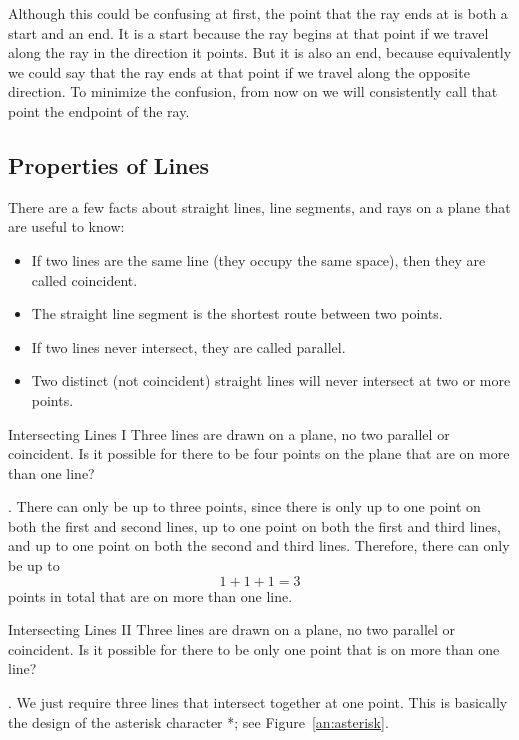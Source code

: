 \documentclass[a4paper,10pt]{report}
\begin{document}
Although this could be confusing at first, the point that the ray ends at is
both a start and an end. It is a start because the ray begins at that point if
we travel along the ray in the direction it points. But it is also an end,
because equivalently we could say that the ray ends at that point if we travel
along the opposite direction. To minimize the confusion, from now on we will
consistently call that point the \gls{endpoint} of the ray.

\subsection{Properties of Lines}

There are a few facts about straight lines, line segments, and rays on a plane
that are useful to know:

\begin{itemize}
 \item If two lines are the same line (they occupy the same space), then they
 are called \gls{coincident}.
 \item The straight line segment is the shortest route between two points.
 \item If two lines never intersect, they are called \gls{parallel}.
 \item Two distinct (not coincident) straight lines will never intersect at two
 or more points.
\end{itemize}

\begin{problem}{Intersecting Lines I}
 Three lines are drawn on a plane, no two parallel or coincident. Is it possible
 for there to be four points on the plane that are on more than one line?

 \begin{solution}
  . There can only be up to three points, since there is only up to one
  point on both the first and second lines, up to one point on both the first
  and third lines, and up to one point on both the second and third lines.
  Therefore, there can only be up to \[ 1 + 1 + 1 = 3 \] points in total that
  are on more than one line.
 \end{solution}
\end{problem}

\begin{problem}{Intersecting Lines II}
 Three lines are drawn on a plane, no two parallel or coincident. Is it possible
 for there to be only one point that is on more than one line?

 \begin{solution}
  . We just require three lines that intersect together at one point.
  This is basically the design of the asterisk character *; see
  Figure~\ref{an:asterisk}.
 \end{solution}
\end{problem}
\end{document}
